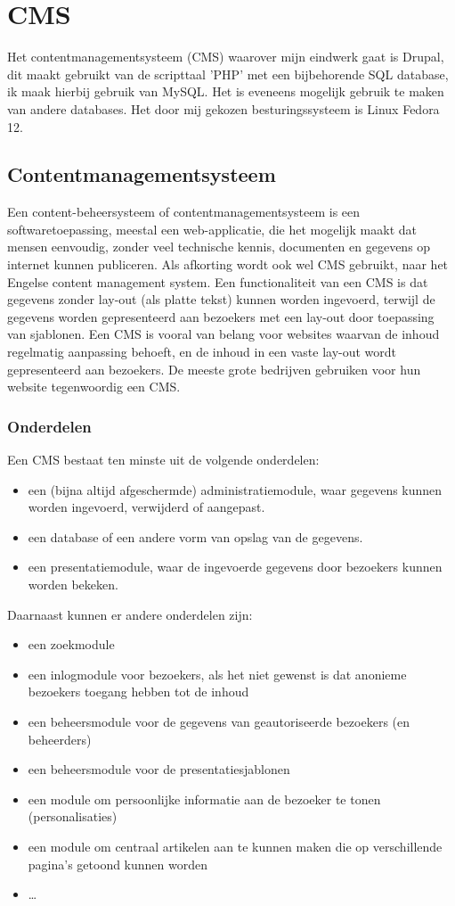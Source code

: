 \chapter{CMS}
Het contentmanagementsysteem (CMS) waarover mijn eindwerk gaat is
Drupal, dit maakt gebruikt van de scripttaal 'PHP' met een bijbehorende SQL database, ik maak hierbij gebruik van
MySQL. Het is eveneens mogelijk gebruik te maken van andere databases. Het door
mij gekozen besturingssysteem is Linux Fedora 12.
\section{Contentmanagementsysteem}
Een content-beheersysteem of contentmanagementsysteem is een softwaretoepassing,
meestal een web-applicatie, die het mogelijk maakt dat mensen eenvoudig, zonder 
veel technische kennis, documenten en gegevens op internet kunnen publiceren. 
Als afkorting wordt ook wel CMS gebruikt, naar het Engelse content management system. 
Een functionaliteit van een CMS is dat gegevens zonder lay-out (als platte tekst) 
kunnen worden ingevoerd, terwijl de gegevens worden gepresenteerd aan bezoekers met 
een lay-out door toepassing van sjablonen. Een CMS is vooral van belang voor websites 
waarvan de inhoud regelmatig aanpassing behoeft, en de inhoud in een vaste lay-out 
wordt gepresenteerd aan bezoekers. De meeste grote bedrijven gebruiken voor hun website 
tegenwoordig een CMS.
\subsection{Onderdelen}
Een CMS bestaat ten minste uit de volgende onderdelen:
\begin{itemize}
  \item een (bijna altijd afgeschermde) administratiemodule, waar gegevens kunnen worden ingevoerd, verwijderd of aangepast.
  \item een database of een andere vorm van opslag van de gegevens.
  \item een presentatiemodule, waar de ingevoerde gegevens door bezoekers
  kunnen worden bekeken.
\end{itemize}
Daarnaast kunnen er andere onderdelen zijn:
\begin{itemize}
  \item een zoekmodule
  \item een inlogmodule voor bezoekers, als het niet gewenst is dat anonieme bezoekers toegang hebben tot de inhoud
  \item een beheersmodule voor de gegevens van geautoriseerde bezoekers (en beheerders)
  \item een beheersmodule voor de presentatiesjablonen
  \item een module om persoonlijke informatie aan de bezoeker te tonen (personalisaties)
  \item een module om centraal artikelen aan te kunnen maken die op verschillende pagina's getoond kunnen worden
  \item \ldots
\end{itemize}

